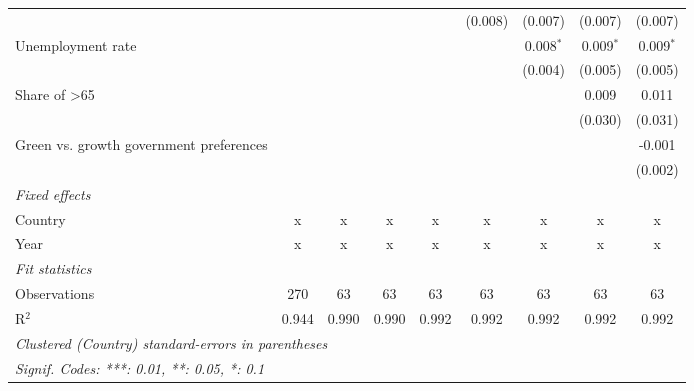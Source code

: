 \begin{table}[htbp]
\begin{tabular}{lcccccccc}
                                                                               &         &         &         &             & (0.008)     & (0.007)     & (0.007)     & (0.007)\\   
      Unemployment rate                                                        &         &         &         &             &             & 0.008$^{*}$ & 0.009$^{*}$ & 0.009$^{*}$\\   
                                                                               &         &         &         &             &             & (0.004)     & (0.005)     & (0.005)\\   
      Share of >65                                                             &         &         &         &             &             &             & 0.009       & 0.011\\   
                                                                               &         &         &         &             &             &             & (0.030)     & (0.031)\\   
      Green vs. growth government preferences                                  &         &         &         &             &             &             &             & -0.001\\   
                                                                               &         &         &         &             &             &             &             & (0.002)\\   
      \emph{Fixed effects}\\
      Country                                                                  & x       & x       & x       & x           & x           & x           & x           & x\\  
      Year                                                                     & x       & x       & x       & x           & x           & x           & x           & x\\  
      \midrule \emph{Fit statistics}\\
      Observations                                                             & 270     & 63      & 63      & 63          & 63          & 63          & 63          & 63\\  
      R$^2$                                                                    & 0.944   & 0.990   & 0.990   & 0.992       & 0.992       & 0.992       & 0.992       & 0.992\\  
      \midrule
      \multicolumn{9}{l}{\emph{Clustered (Country) standard-errors in parentheses}}\\
      \multicolumn{9}{l}{\emph{Signif. Codes: ***: 0.01, **: 0.05, *: 0.1}}\\
   \end{tabular}
\end{table}


